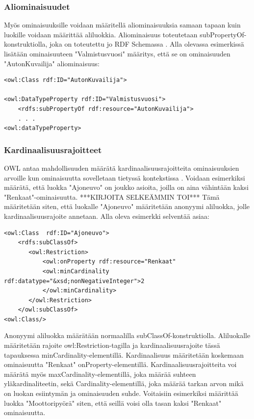 \documentclass[finnish]{tktltiki2}
\theoremstyle{definition}
\theoremstyle{remark}
\begin{document}
\subsubsection{Aliominaisuudet}
Myös ominaisuuksille voidaan määritellä aliominaisuuksia samaan tapaan kuin luokille voidaan määrittää aliluokkia. Aliominaisuus toteutetaan subPropertyOf-konstruktiolla, joka on toteutettu jo RDF Schemassa \cite{SWM04}. Alla olevassa esimerkissä lisätään ominaisuuteen "Valmistusvuosi" määritys, että se on ominaisuuden "AutonKuvailija" aliominaisuus:
\begin{verbatim}
<owl:Class rdf:ID="AutonKuvailija">

<owl:DataTypeProperty rdf:ID="Valmistusvuosi">
    <rdfs:subPropertyOf rdf:resource="AutonKuvailija">
    . . .
<owl:dataTypeProperty>
\end{verbatim}

\subsubsection{Kardinaalisuusrajoitteet}
OWL antaa mahdollisuuden määrätä kardinaalisuusrajoitteita ominaisuuksien arvoille kun ominaisuutta sovelletaan tietyssä kontekstissa \cite{SWM04}. Voidaan esimerkiksi määrätä, että luokka "Ajoneuvo" on joukko asioita, joilla on aina vähintään kaksi "Renkaat"-ominaisuutta. ***KIRJOITA SELKEÄMMIN TOI*** Tämä määritetään siten, että luokalle "Ajoneuvo" määritetään anonyymi aliluokka, jolle kardinaalisuusrajoite annetaan. Alla oleva esimerkki selventää asiaa:
\begin{verbatim}
<owl:Class  rdf:ID="Ajoneuvo">
    <rdfs:subClassOf>
       <owl:Restriction>
           <owl:onProperty rdf:resource="Renkaat"
           <owl:minCardinality rdf:datatype="&xsd;nonNegativeInteger">2
           </owl:minCardinality>
       </owl:Restriction>
    </owl:subClassOf>
<owl:Class/>
\end{verbatim}
Anonyymi aliluokka määrätään normaalilla subClassOf-konstruktiolla. Aliluokalle määritetään rajoite owl:Restriction-tagilla ja kardinaalisuusrajoite tässä tapauksessa  minCardinality-elementillä. Kardinaalisuus määritetään koskemaan ominaisuutta "Renkaat" onProperty-elementillä. Kardinaalisuusrajoitteita voi määrätä myös maxCardinality-elementillä, joka määrää suhteen yläkardinaliteetin, sekä Cardinality-elementillä, joka määrää tarkan arvon mikä on luokan esiintymän ja ominaisuuden suhde. Voitaisiin esimerkiksi määrittää luokka "Moottoripyörä" siten, että seillä voisi olla tasan kaksi "Renkaat" ominaisuutta.   
\end{document}

